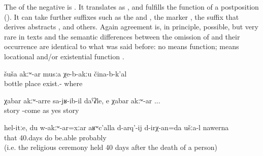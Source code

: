 The  of the negative  is . It translates as  ,  and fulfills the function of a postposition (). It can take further suffixes such as the   and , the  marker  , the suffix  that derives abstracts , and others. Again  agreement is, in principle, possible, but very rare in texts  and the semantic differences between the omission of  and their occurrence are identical to what was said before: no   means  function;   means locational and/or existential function .
%
\begin{exe}
	\ex	\label{ex:There is no place without bottles}
	\gll	šuša	akːʷ-ar	musːa	χe-b-akːu	čina-b-k'al\\
		bottle		place	exist.-	where\\
	\glt	{}

	\ex	\label{ex:as if his arrival was unexpected (lit. without news), yes unexpected}
	\gll	χabar	akːʷ-arre	sa-jʁ-ib-il	daˁʡle,		e	χabar	akːʷ-ar ...\\
		story		-come	as	yes	story	\\
	\glt	{}

	\ex	\label{ex:Well, you like this, even me not being there, should be able to do the 40 days, probably}
	\gll	hel-itːe,	du	w-akːʷ-ar=xːar	aʁʷc'alla	d-arq'-ij	d-irχ-an=da	ušːa-l		nawerna\\
		that			40.days	do	be.able			probably\\
	\glt	{} (i.e. the religious ceremony held 40 days after the death of a person)
\end{exe}

